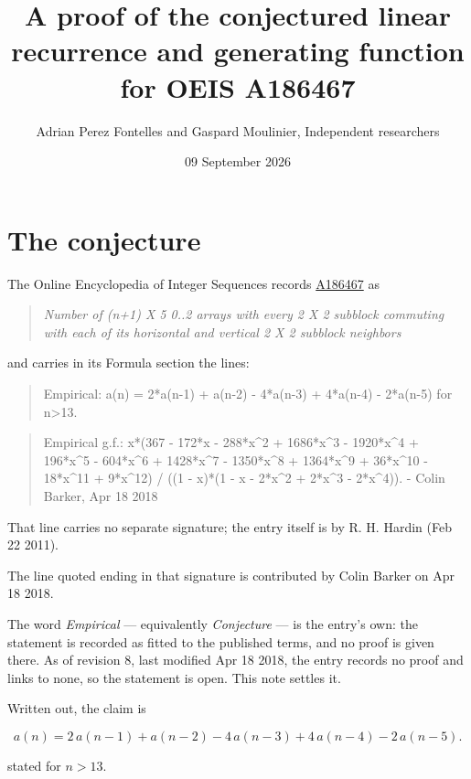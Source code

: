 \documentclass[11pt]{article}
\title{A proof of the conjectured linear recurrence and generating function for OEIS A186467}
\author{Adrian Perez Fontelles and Gaspard Moulinier, Independent researchers}
\date{09 September 2026}
\theoremstyle{definition}
\begin{document}
\maketitle
\section{The conjecture}

The Online Encyclopedia of Integer Sequences records \href{https://oeis.org/A186467}{A186467} as

\begin{quote}\itshape Number of (n+1) X 5 0..2 arrays with every 2 X 2 subblock commuting with each of its horizontal and vertical 2 X 2 subblock neighbors\end{quote}

and carries in its Formula section the lines:

\begin{quote}\ttfamily Empirical: a(n) = 2*a(n-1) + a(n-2) - 4*a(n-3) + 4*a(n-4) - 2*a(n-5) for n>13.\end{quote}

\begin{quote}\ttfamily Empirical g.f.: x*(367 - 172*x - 288*x\textasciicircum{}2 + 1686*x\textasciicircum{}3 - 1920*x\textasciicircum{}4 + 196*x\textasciicircum{}5 - 604*x\textasciicircum{}6 + 1428*x\textasciicircum{}7 - 1350*x\textasciicircum{}8 + 1364*x\textasciicircum{}9 + 36*x\textasciicircum{}10 - 18*x\textasciicircum{}11 + 9*x\textasciicircum{}12) / ((1 - x)*(1 - x - 2*x\textasciicircum{}2 + 2*x\textasciicircum{}3 - 2*x\textasciicircum{}4)). - Colin Barker, Apr 18 2018\end{quote}

That line carries no separate signature; the entry itself is by R. H. Hardin (Feb 22 2011).

The line quoted ending in that signature is contributed by Colin Barker on Apr 18 2018.

The word {\itshape Empirical} --- equivalently {\itshape Conjecture} --- is the entry's own: the statement is recorded as fitted to the published terms, and no proof is given there. As of revision 8, last modified Apr 18 2018, the entry records no proof and links to none, so the statement is open. This note settles it.

Written out, the claim is

\[a(n) = 2\,a(n-1) + a(n-2) - 4\,a(n-3) + 4\,a(n-4) - 2\,a(n-5).\]

stated for $n > 13$.
\end{document}
